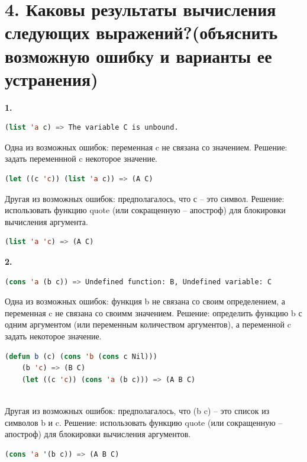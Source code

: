 \documentclass[12pt]{report}
\begin{document}
\section*{4. Каковы результаты вычисления следующих выражений?(объяснить возможную ошибку и варианты ее устранения)}

\textbf{1.}
 
\begin{lstlisting}[language=Lisp]
(list 'a c) => The variable C is unbound.
\end{lstlisting}

Одна из возможных ошибок: переменная c не связана со значением. Решение: задать переменнной c некоторое значение.
\begin{lstlisting}[language=Lisp]
(let ((c 'c)) (list 'a c)) => (A C)
\end{lstlisting}

Другая из возможных ошибок: предполагалось, что с -- это символ. Решение: использовать функцию quote (или сокращенную -- апостроф) для блокировки вычисления аргумента.
\begin{lstlisting}[language=Lisp]
	(list 'a 'c) => (A C)
\end{lstlisting}





\textbf{2.}
\begin{lstlisting}[language=Lisp]
	 (cons 'a (b c)) => Undefined function: B, Undefined variable: C
\end{lstlisting}

Одна из возможных ошибок: функция b не связана со своим определением, а переменная c не связана со своимм значением. Решение: определить функцию b с одним аргументом (или переменным количеством аргументов), а переменной c задать некоторое значение.
\begin{lstlisting}[language=Lisp]
	(defun b (c) (cons 'b (cons c Nil)))
	(b 'c) => (B C)
	(let ((c 'c)) (cons 'a (b c))) => (A B C)
	
\end{lstlisting}

Другая из возможных ошибок: предполагалось, что (b c) -- это список из символов b и c. Решение: использовать функцию quote (или сокращенную -- апостроф) для блокировки вычисления аргументов.
\begin{lstlisting}[language=Lisp]
	(cons 'a '(b c)) => (A B C)
\end{lstlisting}
\end{document}
